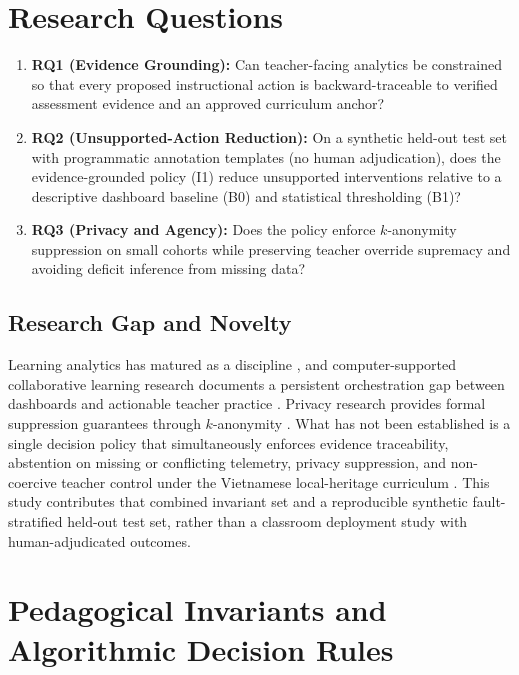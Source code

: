 \documentclass[11pt,a4paper]{article}
\begin{document}
\section{Research Questions}

\begin{enumerate}[label=\textbf{RQ\arabic*}, leftmargin=2.4em]
    \item \textbf{RQ1 (Evidence Grounding):} Can teacher-facing analytics be constrained so that every proposed instructional action is backward-traceable to verified assessment evidence and an approved curriculum anchor?
    \item \textbf{RQ2 (Unsupported-Action Reduction):} On a synthetic held-out test set with programmatic annotation templates (no human adjudication), does the evidence-grounded policy (I1) reduce unsupported interventions relative to a descriptive dashboard baseline (B0) and statistical thresholding (B1)?
    \item \textbf{RQ3 (Privacy and Agency):} Does the policy enforce $k$-anonymity suppression on small cohorts while preserving teacher override supremacy and avoiding deficit inference from missing data?
\end{enumerate}

\subsection{Research Gap and Novelty}

Learning analytics has matured as a discipline \cite{siemens2013learning}, and computer-supported collaborative learning research documents a persistent orchestration gap between dashboards and actionable teacher practice \cite{dillenbourg2013evolution, vanleeuwen2021teacher, wise2021guiding}. Privacy research provides formal suppression guarantees through $k$-anonymity \cite{sweeney2002k}. What has not been established is a single decision policy that simultaneously enforces evidence traceability, abstention on missing or conflicting telemetry, privacy suppression, and non-coercive teacher control under the Vietnamese local-heritage curriculum \cite{moet2018gdpt}. This study contributes that combined invariant set and a reproducible synthetic fault-stratified held-out test set, rather than a classroom deployment study with human-adjudicated outcomes.

\section{Pedagogical Invariants and Algorithmic Decision Rules}
\end{document}
